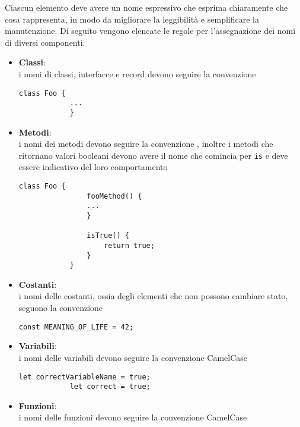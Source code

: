 Ciascun elemento deve avere un nome espressivo che esprima chiaramente che cosa rappresenta, in modo da migliorare la leggibilità e 
semplificare la manutenzione.
Di seguito vengono elencate le regole per l'assegnazione dei nomi di diversi componenti.
\begin{itemize}
	\item \textbf{Classi}:\\
		i nomi di classi, interfacce e record devono seguire la convenzione  \\
        \begin{lstlisting}[style=htmlcssjs]
			class Foo {
			...
			}
		\end{lstlisting}

    \item \textbf{Metodi}:\\
    	i nomi dei metodi devono seguire la convenzione , inoltre i metodi che ritornano valori booleani devono avere il 
    	nome che comincia per \texttt{is} e deve essere indicativo del loro comportamento\\
		\begin{lstlisting}[style=htmlcssjs]
			class Foo {
				fooMethod() {
				...
				}

				isTrue() {
					return true;
				}
			}
		\end{lstlisting}

	\item \textbf{Costanti}:\\
		i nomi delle costanti, ossia degli elementi che non possono cambiare stato, seguono la convenzione 
		 \\
		\begin{lstlisting}[style=htmlcssjs]
			const MEANING_OF_LIFE = 42;
		\end{lstlisting}

    \item \textbf{Variabili}:\\
		i nomi delle variabili devono seguire la convenzione CamelCase \\
		\begin{lstlisting}[style=htmlcssjs]
			let correctVariableName = true;
			let correct = true;
		\end{lstlisting}

	\item \textbf{Funzioni}:\\
		i nomi delle funzioni devono seguire la convenzione CamelCase \\


\end{itemize}
